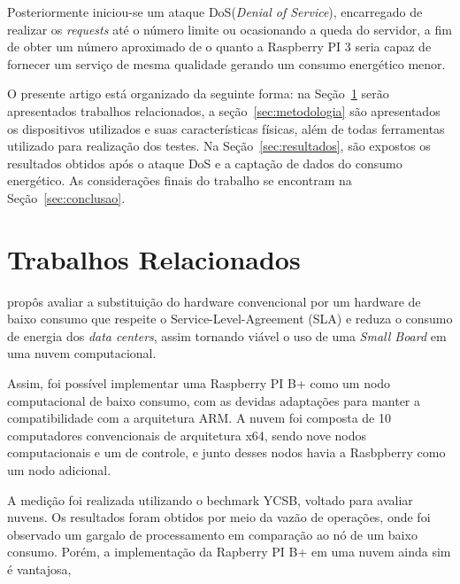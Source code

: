 \documentclass[12pt]{article}
\begin{document}
  Posteriormente iniciou-se um ataque DoS(\textit{Denial of Service}), encarregado de realizar os \textit{requests} até o número limite ou ocasionando a queda do servidor, a fim de obter um número aproximado de o quanto a Raspberry PI 3 seria capaz de fornecer um serviço de mesma qualidade gerando um consumo energético menor.



  O presente artigo está organizado da seguinte forma: na Seção~\ref{sec:trabCorrelatos} serão apresentados trabalhos relacionados, a seção~\ref{sec:metodologia} são apresentados os dispositivos utilizados e suas características físicas, além de todas ferramentas utilizado para realização dos testes. Na Seção~\ref{sec:resultados}, são expostos os resultados obtidos após o ataque DoS e a captação de dados do consumo energético. As considerações finais do trabalho se encontram na Seção~\ref{sec:conclusao}.


\section{Trabalhos Relacionados} \label{sec:trabCorrelatos}
  
 
   \cite{Joao} propôs avaliar a substituição do hardware convencional por um hardware de baixo consumo que respeite o Service-Level-Agreement (SLA) e reduza o consumo de energia dos \textit{data centers}, assim tornando viável o uso de uma \textit{Small Board} em uma nuvem computacional.


Assim, foi possível implementar uma Raspberry PI B+ como um nodo computacional de baixo consumo, com as devidas adaptações para manter a compatibilidade com a arquitetura ARM. A nuvem foi composta de 10 computadores convencionais de arquitetura x64, sendo nove nodos computacionais e um de controle, e junto desses nodos havia a Rasbpberry como um nodo adicional.



  A medição foi realizada utilizando o bechmark YCSB, %
     voltado para avaliar nuvens. Os resultados foram obtidos por meio da vazão de operações, onde foi observado um gargalo de processamento em comparação ao nó de um baixo consumo. Porém, a implementação da Rapberry PI B+ em uma nuvem ainda sim é vantajosa, 
\end{document}
